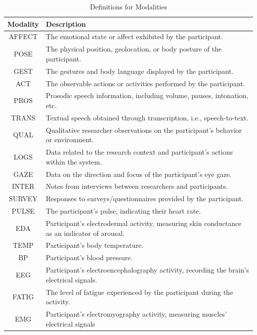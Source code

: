\documentclass[manuscript,screen,review]{acmart}
\begin{document}
\begin{table}[ht]
  \centering
  \caption{Definitions for Modalities}
  \begin{tabular}{|c|p{}|}
    \hline
    \textbf{Modality} & \textbf{Description} \\
    \hline
    AFFECT & The emotional state or affect exhibited by the participant. \\
    \hline
    POSE & The physical position, geolocation, or body posture of the participant. \\
    \hline
    GEST & The gestures and body language displayed by the participant. \\
    \hline
    ACT & The observable actions or activities performed by the participant. \\
    \hline
    PROS & Prosodic speech information, including volume, pauses, intonation, etc. \\
    \hline
    TRANS & Textual speech obtained through transcription, i.e., speech-to-text. \\
    \hline
    QUAL & Qualitative researcher observations on the participant's behavior or environment. \\
    \hline
    LOGS & Data related to the research context and participant's actions within the system. \\
    \hline
    GAZE & Data on the direction and focus of the participant's eye gaze. \\
    \hline
    INTER & Notes from interviews between researchers and participants. \\
    \hline
    SURVEY & Responses to surveys/questionnaires provided by the participant. \\
    \hline
    PULSE & The participant's pulse, indicating their heart rate. \\
    \hline
    EDA & Participant's electrodermal activity, measuring skin conductance as an indicator of arousal. \\
    \hline
    TEMP & Participant’s body temperature. \\
    \hline
    BP & Participant’s blood pressure. \\
    \hline
    EEG & Participant's electroencephalography activity, recording the brain's electrical signals. \\
    \hline
    FATIG & The level of fatigue experienced by the participant during the activity. \\
    \hline
    EMG & Participant's electromyography activity, measuring muscles' electrical signals \\

\end{tabular}
\end{table}
\end{document}
